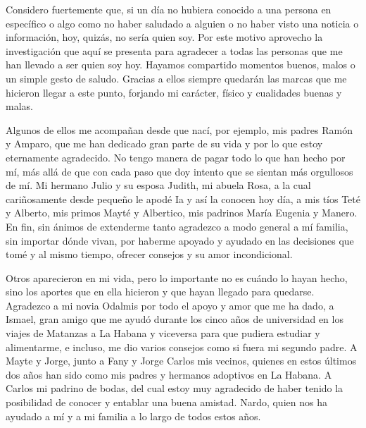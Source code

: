 
\begin{acknowledgements}
	Considero fuertemente que, si un día no hubiera conocido a una persona en específico o algo  como no haber saludado a alguien o no haber visto una noticia o información, hoy, quizás, no sería quien soy. Por este motivo aprovecho la investigación que aquí se presenta para agradecer a todas las personas que me han llevado a ser quien soy hoy. Hayamos compartido momentos buenos, malos o un simple gesto de saludo. Gracias a ellos siempre quedarán las marcas que me hicieron llegar a este punto, forjando mi carácter, físico y cualidades buenas y malas.
	
	Algunos de ellos me acompañan desde que nací, por ejemplo, mis padres Ramón y Amparo, que me han dedicado gran parte de su vida y por lo que estoy eternamente agradecido. No tengo manera de pagar todo lo que han hecho por mí, más allá de que con cada paso que doy intento que se sientan más orgullosos de mí. Mi hermano Julio y su esposa Judith, mi abuela Rosa, a la cual cariñosamente desde pequeño le apodé Ia y así la conocen hoy día, a mis tíos Teté y Alberto, mis primos Mayté y Albertico, mis padrinos María Eugenia y Manero. En fin, sin ánimos de extenderme tanto agradezco a modo general a mí familia, sin importar dónde vivan, por haberme apoyado y ayudado en las decisiones que tomé y al mismo tiempo, ofrecer consejos y su amor incondicional.
	
	Otros aparecieron en mi vida, pero lo importante no es cuándo lo hayan
	hecho, sino los aportes que en ella hicieron y que hayan llegado para quedarse. Agradezco a mi novia Odalmis por todo el apoyo y amor que me ha dado, a Ismael, gran amigo que me ayudó durante los cinco años de universidad en los viajes de Matanzas a La Habana y viceversa para que pudiera estudiar y alimentarme, e incluso, me dio varios consejos como si fuera mi segundo padre. A Mayte y Jorge, junto a Fany y Jorge Carlos mis vecinos, quienes en estos últimos dos años han sido como mis padres y hermanos adoptivos en La Habana. A Carlos mi padrino de bodas, del cual estoy muy agradecido de haber tenido la posibilidad de conocer y entablar una buena amistad. Nardo, quien nos ha ayudado a mí y a mi familia a lo largo de todos estos años.
	

\end{acknowledgements}
